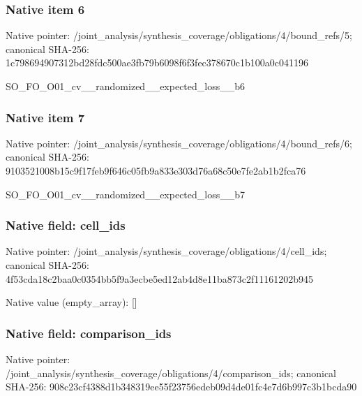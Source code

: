 \documentclass[10pt,a4paper]{article}
\begin{document}
\subsubsection{Native item 6}
Native pointer: /joint\_\allowbreak{}analysis/synthesis\_\allowbreak{}coverage/obligations/4/bound\_\allowbreak{}refs/5; canonical SHA-256: 1c798694907312bd28fdc500ae3fb79b6098f6f3fec378670c1b100a0c041196

\begingroup\raggedright\sloppy SO\_\allowbreak{}FO\_\allowbreak{}O01\_\allowbreak{}cv\_\allowbreak{}\_\allowbreak{}randomized\_\allowbreak{}\_\allowbreak{}expected\_\allowbreak{}loss\_\allowbreak{}\_\allowbreak{}b6\par\endgroup

\subsubsection{Native item 7}
Native pointer: /joint\_\allowbreak{}analysis/synthesis\_\allowbreak{}coverage/obligations/4/bound\_\allowbreak{}refs/6; canonical SHA-256: 9103521008b15c9f17feb9f646c05fb9a833e303d76a68c50e7fe2ab1b2fca76

\begingroup\raggedright\sloppy SO\_\allowbreak{}FO\_\allowbreak{}O01\_\allowbreak{}cv\_\allowbreak{}\_\allowbreak{}randomized\_\allowbreak{}\_\allowbreak{}expected\_\allowbreak{}loss\_\allowbreak{}\_\allowbreak{}b7\par\endgroup

\subsubsection{Native field: cell\_\allowbreak{}ids}
Native pointer: /joint\_\allowbreak{}analysis/synthesis\_\allowbreak{}coverage/obligations/4/cell\_\allowbreak{}ids; canonical SHA-256: 4f53cda18c2baa0c0354bb5f9a3ecbe5ed12ab4d8e11ba873c2f11161202b945

Native value (empty\_\allowbreak{}array): []

\subsubsection{Native field: comparison\_\allowbreak{}ids}
Native pointer: /joint\_\allowbreak{}analysis/synthesis\_\allowbreak{}coverage/obligations/4/comparison\_\allowbreak{}ids; canonical SHA-256: 908c23cf4388d1b348319ee55f23756edeb09d4de01fc4e7d6b997c3b1bcda90
\end{document}
